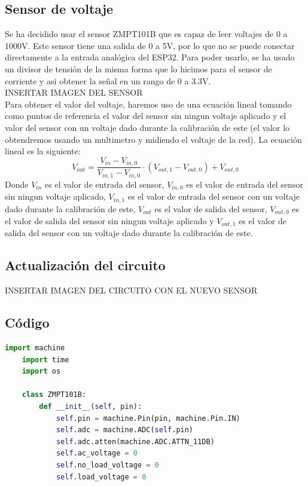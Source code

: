 \begin{titlepage}
\subsection{Sensor de voltaje}
Se ha decidido usar el sensor ZMPT101B que es capaz de leer voltajes de 0 a 1000V. Este sensor tiene una salida de 0 a 5V, por lo que no se puede conectar directamente a la entrada analógica del ESP32. Para poder usarlo, se ha usado un divisor de tensión de la misma forma que lo hicimos para el sensor de corriente y asi obtener la señal en un rango de 0 a 3.3V.\\

INSERTAR IMAGEN DEL SENSOR\\

Para obtener el valor del voltaje, haremos uso de una ecuación lineal tomando como puntos de referencia el valor del sensor sin ningun voltaje aplicado y el valor del sensor con un voltaje dado durante la calibración de este (el valor lo obtendremos usando un multimetro y midiendo el voltaje de la red). La ecuación lineal es la siguiente: \\
\begin{equation}
	V_{out} = \frac{V_{in} - V_{in,0}}{V_{in,1} - V_{in,0}} \cdot (V_{out,1} - V_{out,0}) + V_{out,0}
\end{equation}
Donde $V_{in}$ es el valor de entrada del sensor, $V_{in,0}$ es el valor de entrada del sensor sin ningun voltaje aplicado, $V_{in,1}$ es el valor de entrada del sensor con un voltaje dado durante la calibración de este, $V_{out}$ es el valor de salida del sensor, $V_{out,0}$ es el valor de salida del sensor sin ningun voltaje aplicado y $V_{out,1}$ es el valor de salida del sensor con un voltaje dado durante la calibración de este.\\

\subsection{Actualización del circuito}
INSERTAR IMAGEN DEL CIRCUITO CON EL NUEVO SENSOR

\subsection{Código}
\begin{lstlisting}[language=python]
	import machine
	import time
	import os
	
	class ZMPT101B:
		def __init__(self, pin):
			self.pin = machine.Pin(pin, machine.Pin.IN)
			self.adc = machine.ADC(self.pin)
			self.adc.atten(machine.ADC.ATTN_11DB)
			self.ac_voltage = 0
			self.no_load_voltage = 0
			self.load_voltage = 0
	

\end{lstlisting}
\end{titlepage}
